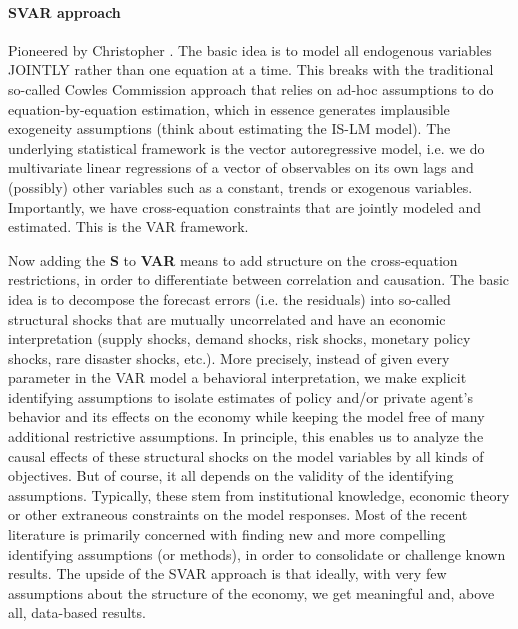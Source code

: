 \paragraph*{SVAR approach}
Pioneered by Christopher \textcite{Sims_1980_MacroeconomicsReality}.
The basic idea is to model all endogenous variables JOINTLY rather than one equation at a time.
This breaks with the traditional so-called Cowles Commission approach that relies on ad-hoc assumptions to do equation-by-equation estimation,
  which in essence generates implausible exogeneity assumptions (think about estimating the IS-LM model).
The underlying statistical framework is the vector autoregressive model,
  i.e. we do multivariate linear regressions of a vector of observables on its own lags and (possibly) other variables such as a constant, trends or exogenous variables.
Importantly, we have cross-equation constraints that are jointly modeled and estimated.
This is the VAR framework.

Now adding the \textbf{S} to \textbf{VAR} means to add structure on the cross-equation restrictions,
  in order to differentiate between correlation and causation.
The basic idea is to decompose the forecast errors (i.e. the residuals) into so-called structural shocks
  that are mutually uncorrelated and have an economic interpretation (supply shocks, demand shocks, risk shocks, monetary policy shocks, rare disaster shocks, etc.).
More precisely, instead of given every parameter in the VAR model a behavioral interpretation,
  we make explicit identifying assumptions to isolate estimates of policy and/or private agent's behavior
  and its effects on the economy while keeping the model free of many additional restrictive assumptions.  
In principle, this enables us to analyze the causal effects of these structural shocks on the model variables by all kinds of objectives.
But of course, it all depends on the validity of the identifying assumptions.
Typically, these stem from institutional knowledge, economic theory or other extraneous constraints on the model responses.
Most of the recent literature is primarily concerned with finding new and more compelling identifying assumptions (or methods),
in order to consolidate or challenge known results.
The upside of the SVAR approach is that ideally, with very few assumptions about the structure of the economy, 
  we get meaningful and, above all, data-based results.

